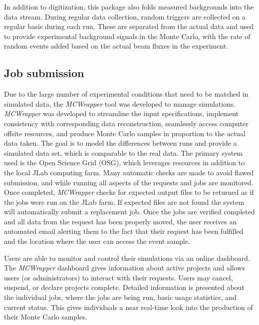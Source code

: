 In addition to digitization, this package also folds measured backgrounds into the data stream. During regular data collection, random triggers are collected on a regular basis during each run. These are separated from the actual data and used to provide experimental background signals in the Monte Carlo, with the rate of random events added based on the actual beam fluxes in the experiment. 

\subsection{Job submission \label{sec:jobsubmission}}
Due to the large number of experimental conditions that need to be matched in simulated data, the \emph{MCWrapper} tool was developed to manage simulations. \emph{MCWrapper} was developed to streamline the input specifications, implement consistency with corresponding data reconstruction, seamlessly access computer offsite resources, and produce Monte Carlo samples in proportion to the actual data taken. The goal is to model the differences between runs and provide a simulated data set, which is comparable to the real data. The primary system used is the Open Science Grid (OSG), which leverages resources in addition to the local JLab computing farm. Many automatic checks are made to avoid flawed submission, and while running all aspects of the requests and jobs are monitored. Once completed, \emph{MCWrapper} checks for expected output files to be returned as if the jobs were run on the JLab farm. If expected files are not found the system will automatically submit a replacement job. Once the jobs are verified completed and all data from the request has been properly moved, the user receives an automated email alerting them to the fact that their request has been fulfilled and the location where the user can access the event sample.

Users are able to monitor and control their simulations via an online dashboard. The \emph{MCWrapper} dashboard gives information about active projects and allows users (or administrators) to interact with their requests. Users may cancel, suspend, or declare projects complete. Detailed information is presented about the individual jobs, where the jobs are being run, basic usage statistics, and current status.  This gives individuals a near real-time look into the production of their Monte Carlo samples.

